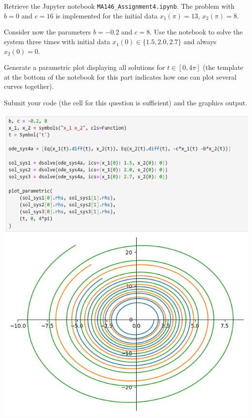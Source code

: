 \documentclass[a4paper]{article}
\begin{document}
\subsection{~} %

\begin{questionbody}
Retrieve the Jupyter notebook \texttt{MA146\_Assignment4.ipynb}. The problem with $b = 0$ and $c = 16$ is implemented for the initial data $x_1(\pi) = 13$, $x_2(\pi) = 8$.

Consider now the parameters $b = −0.2$ and $c = 8$. Use the notebook to solve the system three times with initial data $x_1(0) \in \{1.5, 2.0, 2.7\}$ and always $x_2(0) = 0$.

Generate a parametric plot displaying all solutions for $t \in [0, 4\pi]$ (the template at the bottom of the notebook for this part indicates how one can plot several curves together).

Submit your code (the cell for this question is sufficient) and the graphics output.
\end{questionbody}

\includegraphics[scale=0.55]{Q4}
\end{document}
